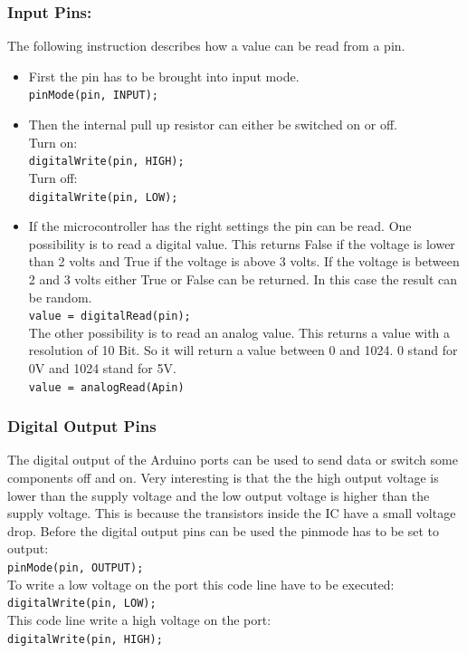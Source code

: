 \subsubsection{Input Pins:} \label{sec:inputPins}
The following instruction describes how a value can be read from a pin.
\begin{itemize}
\item First the pin has to be brought into input mode.\\
\lstinline|pinMode(pin, INPUT);|

\item Then the internal pull up resistor can either be switched on or off.\\
Turn on:\\
\lstinline|digitalWrite(pin, HIGH);|\\
Turn off:\\
\lstinline|digitalWrite(pin, LOW);|\\

\item If the microcontroller has the right settings the pin can be read.
One possibility is to read a digital value.
This returns False if the voltage is lower than 2 volts and True if the voltage is above 3 volts.
If the voltage is between 2 and 3 volts either True or False can be returned.
In this case the result can be random.\\
\lstinline|value = digitalRead(pin);|\\
The other possibility is to read an analog value.
This returns a value with a resolution of 10 Bit.
So it will return a value between 0 and 1024.
0 stand for 0V and 1024 stand for 5V.\\
\lstinline|value = analogRead(Apin)|\\
\end{itemize}


\subsubsection{Digital Output Pins}\label{sec:digitalOutputPins}
The digital output of the Arduino ports can be used to send data or switch some components off and on.
Very interesting is that the the high output voltage is lower than the supply voltage and the low output voltage is higher than the supply voltage.
This is because the transistors inside the IC have a small voltage drop.
Before the digital output pins can be used the pinmode has to be set to output:\\
\lstinline|pinMode(pin, OUTPUT);|\\
To write a low voltage on the port this code line have to be executed:\\
\lstinline|digitalWrite(pin, LOW);|\\
This code line write a high voltage on the port:\\
\lstinline|digitalWrite(pin, HIGH);|\\



